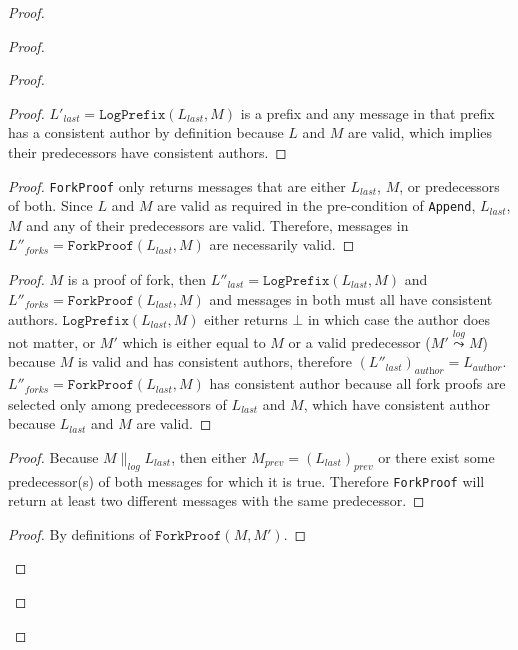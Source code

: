 \documentclass[9pt, oneside]{article}   	%
\newcommand{\logleadsto}{\overset{\textit{log}}\leadsto}
\begin{document}
\begin{proof}
\begin{proof}
\begin{proof}
				\begin{proof}
					$L'_\textit{last} = \texttt{LogPrefix}(L_\textit{last},M)$ is a prefix and any message in that prefix has a consistent author by definition because $L$ and $M$ are valid, which implies their predecessors have consistent authors.
				\end{proof} 	

				\begin{proof}
					\texttt{ForkProof} only returns messages that are either $L_\textit{last}$, $M$, or predecessors of both. Since $L$ and $M$ are valid as required in the pre-condition of \texttt{Append}, $L_\textit{last}$, $M$ and any of their predecessors are valid. Therefore, messages in $L''_\textit{forks} = \texttt{ForkProof}(L_\textit{last}, M)$ are necessarily valid.
				\end{proof}
			
				\begin{proof}
					$M$ is a proof of fork, then $L''_\textit{last} = \texttt{LogPrefix}(L_\textit{last}, M)$ and $L''_\textit{forks} = \texttt{ForkProof}(L_\textit{last}, M)$ and messages in both must all have consistent authors. $\texttt{LogPrefix}(L_\textit{last}, M)$ either returns $\bot$ in which case the author does not matter, or $M'$ which is either equal to $M$ or a valid predecessor ($M' \logleadsto M$) because $M$ is valid and has consistent authors, therefore $(L''_\textit{last})_\textit{author} = L_\textit{author}$. $L''_\textit{forks} = \texttt{ForkProof}(L_\textit{last}, M)$ has consistent author because all fork proofs are selected only among predecessors of $L_\textit{last}$ and $M$, which have consistent author because $L_\textit{last}$ and $M$ are valid.
				\end{proof}

			
				\begin{proof}
					Because $M \parallel_\textit{log} L_\textit{last}$, then either $M_\textit{prev} = (L_\textit{last})_\textit{prev}$ or there exist some predecessor(s) of both messages for which it is true. Therefore \texttt{ForkProof} will return at least two different messages with the same predecessor.
				\end{proof}
			
				\begin{proof}
					By definitions of $\texttt{ForkProof}(M,M')$.
				\end{proof}


\end{proof}
\end{proof}
\end{proof}
\end{document}
